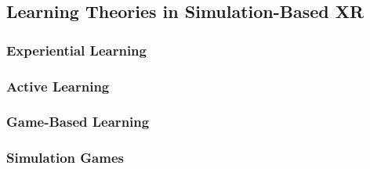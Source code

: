 \subsection{Learning Theories in Simulation-Based XR}

\subsubsection{Experiential Learning}

\subsubsection{Active Learning}

\subsubsection{Game-Based Learning}

\subsubsection{Simulation Games}
